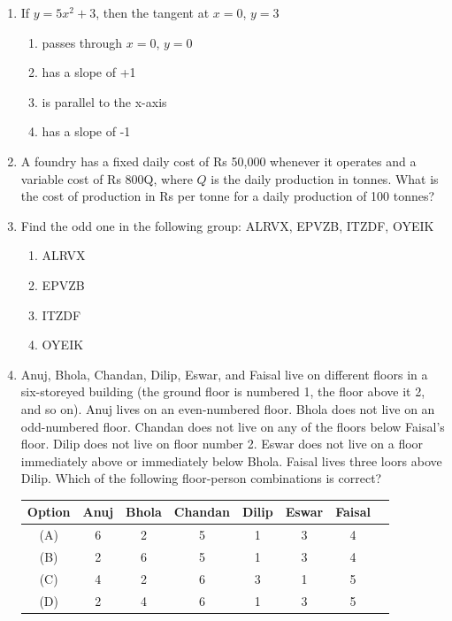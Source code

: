 \documentclass[journal,12pt,onecolumn]{IEEEtran}
\theoremstyle{remark}
\begin{document}
\begin{enumerate}
\item  If $y = 5x^2+ 3$, then the tangent at $x = 0$, $y = 3$

\begin{enumerate}
\item  passes through $x = 0$, $y = 0$
\item  has a slope of +1
\item  is parallel to the x-axis
\item  has a slope of -1
\end{enumerate}

\item 
A foundry has a fixed daily cost of Rs 50,000 whenever it operates and a variable cost of Rs 800Q, where $Q$ is the daily production in tonnes. What is the cost of production in Rs per tonne for a daily production of 100 tonnes?

\item Find the odd one in the following group: ALRVX, EPVZB, ITZDF, OYEIK

\begin{enumerate}
    \item ALRVX
    \item EPVZB
    \item ITZDF
    \item OYEIK
\end{enumerate}


\item Anuj, Bhola, Chandan, Dilip, Eswar, and Faisal live on different floors in a six-storeyed building (the ground floor is numbered 1, the floor above it 2, and so on). Anuj lives on an even-numbered floor. Bhola does not live on an odd-numbered floor. Chandan does not live on any of the floors below Faisal's floor. Dilip does not live on floor number 2. Eswar does not live on a floor immediately above or immediately below Bhola. Faisal lives three loors above Dilip. Which of the following floor-person combinations is correct?

\begin{center}
\begin{tabular}[12pt]{|c|c|c|c|c|c|c|c|}
\hline
Option & Anuj & Bhola & Chandan & Dilip & Eswar & Faisal \\
\hline
(A) & 6 & 2 & 5 & 1 & 3 & 4 \\
\hline
(B) & 2 & 6 & 5 & 1 & 3 & 4 \\
\hline
(C) & 4 & 2 & 6 & 3 & 1 & 5 \\
\hline
(D) & 2 & 4 & 6 & 1 & 3 & 5 \\
\hline
\end{tabular}
\end{center}







\end{enumerate}
\end{document}
